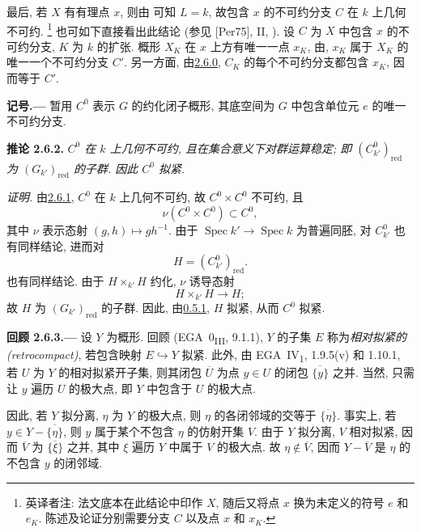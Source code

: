 最后, 若 \(X\) 有有理点 \(x\), 则由
可知 \(L=k\), 故包含 \(x\) 的不可约分支 \(C\) 在 \(k\) 上几何不可约.\begingroup
\renewcommand{\thefootnote}{\fnsymbol{footnote}}%
\footnote[1]{英译者注: 法文底本在此结论中印作 \(X\), 随后又将点 \(x\)
换为未定义的符号 \(e\) 和 \(e_K\).
陈述及论证分别需要分支 \(C\) 以及点 \(x\) 和 \(x_K\).}%
\endgroup
也可如下直接看出此结论 (参见 [Per75], II, ).
设 \(C\) 为 \(X\) 中包含 \(x\) 的不可约分支, \(K\) 为 \(k\) 的扩张.
概形 \(X_K\) 在 \(x\) 上方有唯一一点 \(x_K\),
由, \(x_K\) 属于 \(X_K\) 的唯一一个不可约分支 \(C'\).
另一方面, 由\hyperref[lem:sga3-VIA-2.6.0]{2.6.0},
\(C_K\) 的每个不可约分支都包含 \(x_K\), 因而等于 \(C'\).

\medskip
{}\label{not:sga3-VIA-C0}%
\noindent\textbf{记号.---}
暂用 \(C^0\) 表示 \(G\) 的约化闭子概形,
其底空间为 \(G\) 中包含单位元 \(e\) 的唯一不可约分支.

\medskip
{}\label{cor:sga3-VIA-2.6.2}%
\noindent\textbf{推论 2.6.2.}
\textit{\(C^0\) 在 \(k\) 上几何不可约, 且在集合意义下对群运算稳定;
即 \((C^0_{k'})_{\mathrm{red}}\) 为 \((G_{k'})_{\mathrm{red}}\) 的子群.
因此 \(C^0\) 拟紧.}

\noindent\textit{证明.}
由\hyperref[prop:sga3-VIA-2.6.1]{2.6.1}, \(C^0\) 在 \(k\) 上几何不可约,
故 \(C^0\times C^0\) 不可约, 且
\[
  \nu(C^0\times C^0)\subset C^0,
\]
其中 \(\nu\) 表示态射 \((g,h)\mapsto gh^{-1}\).
由于 \(\operatorname{Spec}k'\to\operatorname{Spec}k\) 为普遍同胚,
对 \(C^0_{k'}\) 也有同样结论, 进而对
\[
  H=(C^0_{k'})_{\mathrm{red}}.
\]
也有同样结论. 由于 \(H\times_{k'}H\) 约化, \(\nu\) 诱导态射
\[
  H\times_{k'}H\longrightarrow H;
\]
故 \(H\) 为 \((G_{k'})_{\mathrm{red}}\) 的子群.
因此, 由\hyperref[sga3:VIA:0.5.1]{0.5.1}, \(H\) 拟紧, 从而 \(C^0\) 拟紧.

\medskip
{}\label{rem:sga3-VIA-2.6.3}%
\noindent\textbf{回顾 2.6.3.---}
设 \(Y\) 为概形. 回顾 (EGA~0\textsubscript{III}, 9.1.1),
\(Y\) 的子集 \(E\) 称为\emph{相对拟紧的 (retrocompact)},
若包含映射 \(E\hookrightarrow Y\) 拟紧.
此外, 由 EGA~IV\textsubscript{1}, 1.9.5(v) 和 1.10.1,
若 \(U\) 为 \(Y\) 的相对拟紧开子集, 则其闭包 \(\overline U\)
为点 \(y\in U\) 的闭包 \(\overline{\{y\}}\) 之并.
当然, 只需让 \(y\) 遍历 \(U\) 的极大点, 即 \(Y\) 中包含于 \(U\) 的极大点.

因此, 若 \(Y\) 拟分离, \(\eta\) 为 \(Y\) 的极大点,
则 \(\eta\) 的各闭邻域的交等于 \(\overline{\{\eta\}}\).
事实上, 若 \(y\in Y-\overline{\{\eta\}}\),
则 \(y\) 属于某个不包含 \(\eta\) 的仿射开集 \(V\).
由于 \(Y\) 拟分离, \(V\) 相对拟紧,
因而 \(\overline V\) 为 \(\overline{\{\xi\}}\) 之并,
其中 \(\xi\) 遍历 \(Y\) 中属于 \(V\) 的极大点.
故 \(\eta\notin\overline V\), 因而 \(Y-\overline V\)
是 \(\eta\) 的不包含 \(y\) 的闭邻域.

